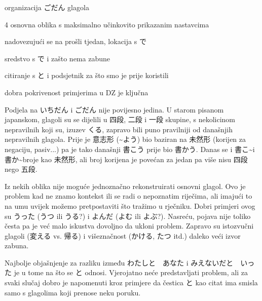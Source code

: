 
\author{Tomislav Mamić}

	
	
	\vspace{-10pt}
	\begin{hyou}
		\item organizacija ごだん glagola
		\item 4 osnovna oblika s maksimalno učinkovito prikazanim nastavcima
		\item nadovezujući se na prošli tjedan, lokacija s で
		\item sredstvo s で i zašto nema zabune
		\item citiranje s と i podsjetnik za što smo je prije koristili
		\item dobra pokrivenost primjerima u DZ je ključna
	\end{hyou}

	
	Podjela na いちだん i ごだん nije povijesno jedina. U starom pisanom japanskom, glagoli su se dijelili u 四段, 二段 i 一段 skupine, s nekolicinom nepravilnih koji su, izuzev くる, zapravo bili puno pravilniji od današnjih nepravilnih glagola. Prije je 意志形 (\textasciitilde よう) bio baziran na 未然形 (korijen za negaciju, pasiv...) pa je tako današnji 書こう prije bio 書かう. Danas se i 書こ\textasciitilde i 書か\textasciitilde broje kao 未然形, ali broj korijena je povećan za jedan pa više nisu 四段 nego 五段.
	
	Iz nekih oblika nije moguće jednoznačno rekonstruirati osnovni glagol. Ovo je problem kad ne znamo kontekst ili se radi o nepoznatim riječima, ali imajući to na umu uvijek možemo pretpostaviti što tražimo u rječniku. Dobri primjeri ovog su うった (うつ ili うる?) i よんだ (よむ ili よぶ?). Nasreću, pojava nije toliko česta pa je već malo iskustva dovoljno da ukloni problem. Zapravo su istozvučni glagoli (変える vs. 帰る) i višeznačnost (かける, たつ itd.) daleko veći izvor zabuna.
	
	Najbolje objašnjenje za razliku između わたしと　あなた i みえないだと　いった je u tome na što se と odnosi. Vjerojatno neće predstavljati problem, ali za svaki slučaj dobro je napomenuti kroz primjere da čestica と kao citat ima smisla samo s glagolima koji prenose neku poruku.
